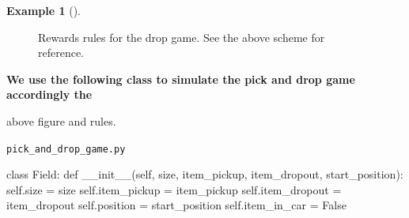 \documentclass[
  letterpaper,
]{krantz}
\makeatletter
\newenvironment{Shaded}{\begin{snugshade}}{\end{snugshade}}
\newcommand{\FunctionTok}[1]{\textcolor[rgb]{0.28,0.35,0.67}{#1}}
\newcommand{\KeywordTok}[1]{\textcolor[rgb]{0.00,0.23,0.31}{#1}}
\newcommand{\NormalTok}[1]{\textcolor[rgb]{0.00,0.23,0.31}{#1}}
\newcommand{\OperatorTok}[1]{\textcolor[rgb]{0.37,0.37,0.37}{#1}}
\newcommand{\VariableTok}[1]{\textcolor[rgb]{0.07,0.07,0.07}{#1}}
\newenvironment{kframe}{%
\medskip{}
\setlength{\fboxsep}{.8em}
 \def\at@end@of@kframe{}%
 \ifinner\ifhmode%
  \def\at@end@of@kframe{\end{minipage}}%
  \begin{minipage}{\columnwidth}%
 \fi\fi%
 \def\FrameCommand##1{\hskip\@totalleftmargin \hskip-\fboxsep
 \colorbox{shadecolor}{##1}\hskip-\fboxsep
     \hskip-\linewidth \hskip-\@totalleftmargin \hskip\columnwidth}%
 \MakeFramed {\advance\hsize-\width
   \@totalleftmargin\z@ \linewidth\hsize
   \@setminipage}}%
 {\par\unskip\endMakeFramed%
 \at@end@of@kframe}
\renewenvironment{Shaded}{\begin{kframe}}{\end{kframe}}
\theoremstyle{plain}
\theoremstyle{definition}
\newtheorem{example}{Example}[chapter]
\theoremstyle{definition}
\theoremstyle{remark}
\makeatother
\begin{document}
\begin{example}[]
\begin{figure}
\end{figure}%

\begin{figure}


\caption{\label{fig-pick_and_drop_rules}Rewards rules for the drop game.
See the above scheme for reference.}

\end{figure}%

\begin{tcolorbox}[enhanced jigsaw, bottomrule=.15mm, opacityback=0, breakable, colframe=quarto-callout-tip-color-frame, left=2mm, rightrule=.15mm, toprule=.15mm, leftrule=.75mm, arc=.35mm, colback=white]

\vspace{-3mm}\textbf{We use the following class to simulate the pick and drop game
accordingly the}\vspace{3mm}

above figure and rules.

\begin{codelisting}[H]

\caption{\texttt{pick\_and\_drop\_game.py}}

\begin{Shaded}
\begin{Highlighting}[]
\KeywordTok{class}\NormalTok{ Field:}
    \KeywordTok{def} \FunctionTok{\_\_init\_\_}\NormalTok{(}\VariableTok{self}\NormalTok{, size, item\_pickup, item\_dropout, start\_position):}
        \VariableTok{self}\NormalTok{.size }\OperatorTok{=}\NormalTok{ size}
        \VariableTok{self}\NormalTok{.item\_pickup }\OperatorTok{=}\NormalTok{ item\_pickup}
        \VariableTok{self}\NormalTok{.item\_dropout }\OperatorTok{=}\NormalTok{ item\_dropout}
        \VariableTok{self}\NormalTok{.position }\OperatorTok{=}\NormalTok{ start\_position}
        \VariableTok{self}\NormalTok{.item\_in\_car }\OperatorTok{=} \VariableTok{False}
    

\end{Highlighting}
\end{Shaded}
\end{codelisting}
\end{tcolorbox}
\end{example}
\end{document}
